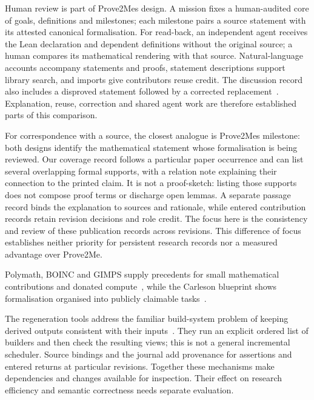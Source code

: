 \documentclass[10pt]{article}
\begin{document}
Human review is part of Prove2Me\textquotesingle s design. A mission fixes a human-audited core of goals, definitions and milestones; each milestone pairs a source statement with its attested canonical formalisation. For read-back, an independent agent receives the Lean declaration and dependent definitions without the original source; a human compares its mathematical rendering with that source. Natural-language accounts accompany statements and proofs, statement descriptions support library search, and imports give contributors reuse credit. The discussion record also includes a disproved statement followed by a corrected replacement~\cite[Sections~3.3 and~4.3--4.5]{prove2me}. Explanation, reuse, correction and shared agent work are therefore established parts of this comparison.

For correspondence with a source, the closest analogue is Prove2Me\textquotesingle s milestone: both designs identify the mathematical statement whose formalisation is being reviewed. Our coverage record follows a particular paper occurrence and can list several overlapping formal supports, with a relation note explaining their connection to the printed claim. It is not a proof-sketch: listing those supports does not compose proof terms or discharge open lemmas. A separate passage record binds the explanation to sources and rationale, while entered contribution records retain revision decisions and role credit. The focus here is the consistency and review of these publication records across revisions. This difference of focus establishes neither priority for persistent research records nor a measured advantage over Prove2Me.

Polymath, BOINC and GIMPS supply precedents for small mathematical contributions and donated compute~\cite{polymath,boinc,gimps}, while the Carleson blueprint shows formalisation organised into publicly claimable tasks~\cite{carleson}.


The regeneration tools address the familiar build-system problem of keeping derived outputs consistent with their inputs~\cite{buildsystems}. They run an explicit ordered list of builders and then check the resulting views; this is not a general incremental scheduler. Source bindings and the journal add provenance for assertions and entered returns at particular revisions. Together these mechanisms make dependencies and changes available for inspection. Their effect on research efficiency and semantic correctness needs separate evaluation.
\end{document}

